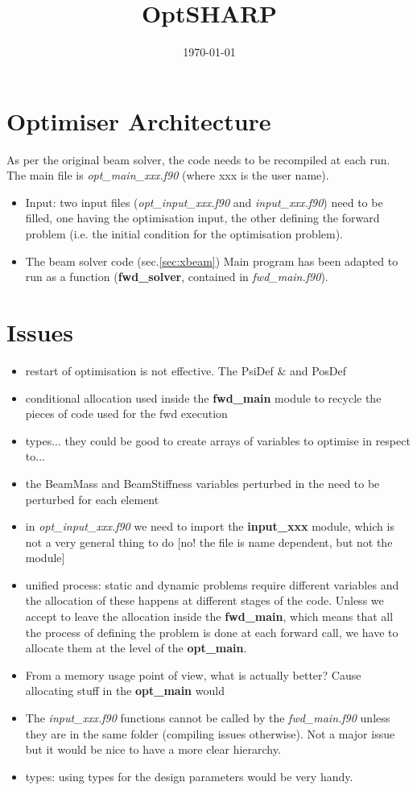 \documentclass[a4paper,10pt]{article}
\title{OptSHARP}
\date{\today}
\newcommand{\bit}{\begin{itemize}}
\newcommand{\eit}{\end{itemize}}
\newcommand{\ffile}[1]{\textsl{{#1}.f90}} %
\newcommand{\ffun}[1]{\textbf{{#1}}}  %
\begin{document}
\maketitle



\section{Optimiser Architecture}
As per the original beam solver, the code needs to be recompiled at each run. The main file is \ffile{opt\_main\_xxx} (where xxx is the user name).
\bit
\item Input: two input files (\ffile{opt\_input\_xxx} and \ffile{input\_xxx}) need to be filled, one having the optimisation input, the other defining the forward problem (i.e. the initial condition for the optimisation problem).

\item The beam solver code (sec.\ref{sec:xbeam}) Main program has been adapted to run as a function (\ffun{fwd\_solver}, contained in \ffile{fwd\_main}). 


\eit



\section{Issues}
\bit
\item restart of optimisation is not effective. The PsiDef & and PosDef
\item conditional allocation used inside the \ffun{fwd\_main} module to recycle the pieces of code used for the fwd execution
\item types... they could be good to create arrays of variables to optimise in respect to...
\item the BeamMass and BeamStiffness variables perturbed in the need to be perturbed for each element
\item in \ffile{opt\_input\_xxx} we need to import the \ffun{input\_xxx} module, which is not a very general thing to do [no! the file is name dependent, but not the module]
\item unified process: static and dynamic problems require different variables and the allocation of these happens at different stages of the code. Unless we accept to leave the allocation inside the \ffun{fwd\_main}, which means that all the process of defining the problem is done at each forward call, we have to allocate them at the level of the \ffun{opt\_main}.
\item From a memory usage point of view, what is actually better? Cause allocating stuff in the \ffun{opt\_main} would 
\item The \ffile{input\_xxx} functions cannot be called by the \ffile{fwd\_main} unless they are in the same folder (compiling issues otherwise). Not a major issue but it would be nice to have a more clear hierarchy.
\item types: using types for the design parameters would be very handy.
\eit
\end{document}
